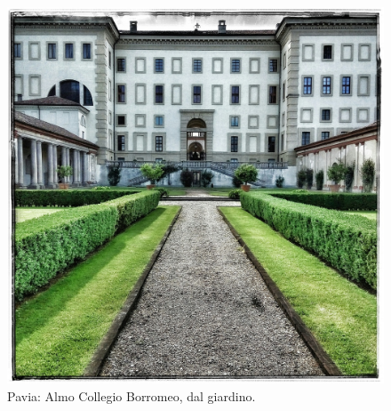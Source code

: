 \documentclass[nols]{tufte-handout}
\begin{document}
\begin{figure}[!b]
  \includegraphics[width=0.8\linewidth]{thumb-lesson_Intro.jpeg}
  \caption{Pavia: Almo Collegio Borromeo, dal giardino.}
  \label{fig:textfig}
\end{figure}

 


\end{document}
